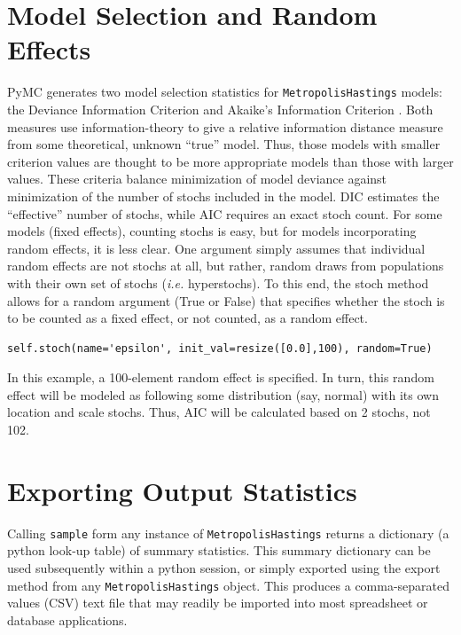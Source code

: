 \documentclass[]{book}
\begin{document}
\section{Model Selection and Random Effects}

PyMC generates two model selection statistics for \verb=MetropolisHastings= models: the Deviance Information Criterion \citep[DIC][]{Spiegelhalter:2002ma} and Akaike’s Information Criterion \citep[AIC][]{Burnham:2002ic}. Both measures use information-theory to give a relative information distance measure from some theoretical, unknown “true” model. Thus, those models with smaller criterion values are thought to be more appropriate models than those with larger values. These criteria balance minimization of model deviance against minimization of the number of stochs included in the model. DIC estimates the “effective” number of stochs, while AIC requires an exact stoch count. For some models (fixed effects), counting stochs is easy, but for models incorporating random effects, it is less clear. One argument simply assumes that individual random effects are not stochs at all, but rather, random draws from populations with their own set of stochs (\emph{i.e.} hyperstochs). To this end, the stoch method allows for a random argument (True or False) that specifies whether the stoch is to be counted as a fixed effect, or not counted, as a random effect.
\begin{verbatim}
self.stoch(name='epsilon', init_val=resize([0.0],100), random=True)
\end{verbatim}

In this example, a 100-element random effect is specified. In turn, this random effect will be modeled as following some distribution (say, normal) with its own location and scale stochs. Thus, AIC will be calculated based on 2 stochs, not 102.

\section{Exporting Output Statistics}

Calling \verb=sample= form any instance of \verb=MetropolisHastings= returns a dictionary (a python look-up table) of summary statistics. This summary dictionary can be used subsequently within a python session, or simply exported using the export method from any \verb=MetropolisHastings= object. This produces a comma-separated values (CSV) text file that may readily be imported into most spreadsheet or database applications.
\end{document}
